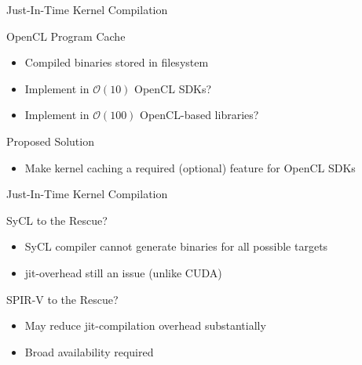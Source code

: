\begin{frame}[fragile]{Just-In-Time Kernel Compilation}

 \begin{block}{OpenCL Program Cache}
   \begin{itemize}
    \item Compiled binaries stored in filesystem
    \item Implement in $\mathcal{O}(10)$ OpenCL SDKs?
    \item Implement in $\mathcal{O}(100)$ OpenCL-based libraries?
   \end{itemize}
 \end{block}

 \begin{block}{Proposed Solution}
   \begin{itemize}
    \item Make kernel caching a required (optional) feature for OpenCL SDKs
   \end{itemize}
 \end{block}

\end{frame}



\begin{frame}[fragile]{Just-In-Time Kernel Compilation}

 \begin{block}{SyCL to the Rescue?}
   \begin{itemize}
    \item SyCL compiler cannot generate binaries for all possible targets
    \item jit-overhead still an issue (unlike CUDA)
   \end{itemize}
 \end{block}

 \begin{block}{SPIR-V to the Rescue?}
   \begin{itemize}
    \item May reduce jit-compilation overhead substantially
    \item Broad availability required
   \end{itemize}
 \end{block}

\end{frame}
